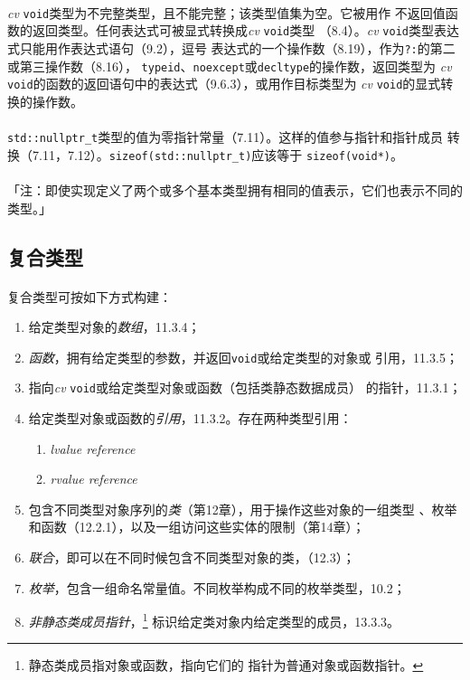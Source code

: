 \paragraph{}
\textit{cv} \texttt{void}类型为不完整类型，且不能完整；该类型值集为空。它被用作
不返回值函数的返回类型。任何表达式可被显式转换成\textit{cv} \texttt{void}类型
（8.4）。\textit{cv} \texttt{void}类型表达式只能用作表达式语句（9.2），逗号
表达式的一个操作数（8.19），作为\texttt{?:}的第二或第三操作数（8.16），
\texttt{typeid}、\texttt{noexcept}或\texttt{decltype}的操作数，返回类型为
\textit{cv} \texttt{void}的函数的返回语句中的表达式（9.6.3），或用作目标类型为
\textit{cv} \texttt{void}的显式转换的操作数。

\paragraph{}
\texttt{std::nullptr\_t}类型的值为零指针常量（7.11）。这样的值参与指针和指针成员
转换（7.11，7.12）。\texttt{sizeof(std::nullptr\_t)}应该等于
\texttt{sizeof(void*)}。

\paragraph{}
「注：即使实现定义了两个或多个基本类型拥有相同的值表示，它们也表示不同的类型。」

\subsection{复合类型}
\paragraph{}
复合类型可按如下方式构建：
\begin{enumerate}
  \item{给定类型对象的\textit{数组}，11.3.4；}
  \item{\textit{函数}，拥有给定类型的参数，并返回\texttt{void}或给定类型的对象或
    引用，11.3.5；}
  \item{指向\textit{cv} \texttt{void}或给定类型对象或函数（包括类静态数据成员）
    的指针，11.3.1；}
  \item{给定类型对象或函数的\textit{引用}，11.3.2。存在两种类型引用：
      \begin{enumerate}
        \item{\textit{lvalue reference}}
        \item{\textit{rvalue reference}}
    \end{enumerate}}
  \item{包含不同类型对象序列的\textit{类}（第12章），用于操作这些对象的一组类型
    、枚举和函数（12.2.1），以及一组访问这些实体的限制（第14章）；}
  \item{\textit{联合}，即可以在不同时候包含不同类型对象的类，（12.3）；}
  \item{\textit{枚举}，包含一组命名常量值。不同枚举构成不同的枚举类型，10.2；}
  \item{\textit{非静态类成员指针}，\footnote{静态类成员指对象或函数，指向它们的
    指针为普通对象或函数指针。} 标识给定类对象内给定类型的成员，13.3.3。}
\end{enumerate}

